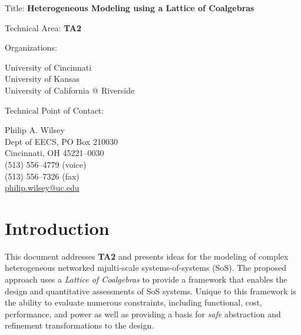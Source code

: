 \documentclass[12pt]{article}
\begin{document}
\noindent
{\Large Title: \textbf{Heterogeneous Modeling using a Lattice of Coalgebras}}

\bigskip
\bigskip
\bigskip
\bigskip
\bigskip

\noindent
Technical Area: \textbf{TA2}

\bigskip
\bigskip
\bigskip
\bigskip

\noindent
Organizations: \begin{minipage}[t]{4in}
  \textsf{University of Cincinnati} \\
  \textsf{University of Kansas} \\
  \textsf{University of California @ Riverside}
\end{minipage}

\bigskip
\bigskip
\bigskip
\bigskip

\noindent
Technical Point of Contact: \begin{minipage}[t]{4in}
  Philip A. Wilsey \\
  Dept of EECS, PO Box 210030 \\
  Cincinnati, OH 45221--0030 \\
  (513) 556--4779 (voice) \\
  (513) 556--7326 (fax) \\
  \url{philip.wilsey@uc.edu}
\end{minipage}

\clearpage

\section{Introduction}

This document addresses \textbf{TA2} and presents ideas for the modeling of complex
heterogeneous networked mjulti-scale systems-of-systems (SoS).  The proposed approach uses
a \emph{Lattice of Coalgebras} to provide a framework that enables the design and quantitative
assessments of SoS systems.  Unique to this framework is the ability to evaluate numerous
constraints, including functional, cost, performance, and power as well as providing a
basis for \emph{safe} abstraction and refinement transformations to the design.
\end{document}

